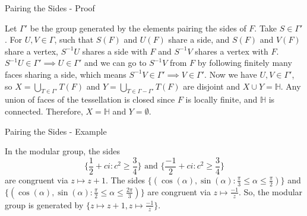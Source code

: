 \documentclass[
	american,
	sections numbered,
	usenames,
	xcolor=dvipsnames,
	aspectratio=169,
]{beamer}
\renewcommand{\H}{\mathbb{H}}
\theoremstyle{plain}%
\begin{document}
\begin{frame}{Pairing the Sides - Proof}

	Let $\Gamma'$ be the group generated by the elements pairing the sides of $F$. Take $S\in\Gamma'$. For $U,V\in\Gamma$, such that $S(F)$ and $U(F)$ share a side, and $S(F)$ and $V(F)$ share a vertex, $S^{-1}U$ shares a side with $F$ and $S^{-1}V$ shares a vertex with $F$. $S^{-1}U\in\Gamma'\implies U\in\Gamma'$ and we can go to $S^{-1}V$ from $F$ by following finitely many faces sharing a side, which means $S^{-1}V\in\Gamma'\implies V\in\Gamma'$. Now we have $U,V\in\Gamma'$, so $X=\bigcup_{T\in\Gamma'}T(F)$ and $Y=\bigcup_{T\in\Gamma-\Gamma'}T(F)$ are disjoint and $X\cup Y=\H$. Any union of faces of the tessellation is closed since $F$ is locally finite, and $\H$ is connected. Therefore, $X=\H$ and $Y=\emptyset$.

\end{frame}

\begin{frame}{Pairing the Sides - Example}

    \begin{minipage}{0.49\textwidth}
		\begin{center}
        \end{center}
	\end{minipage}
	\begin{minipage}{0.5\textwidth}
		In the modular group, the sides $$\{\frac{1}{2}+ci:c^2\geq\frac{3}{4}\}\text{ and }\{\frac{-1}{2}+ci:c^2\geq\frac{3}{4}\}$$ are congruent via $z\mapsto z+1$. The sides $\{(\cos(\alpha),\sin(\alpha):\frac{\pi}{3}\leq\alpha\leq\frac{\pi}{2})\}$ and $\{(\cos(\alpha),\sin(\alpha):\frac{\pi}{2}\leq\alpha\leq\frac{2\pi}{3})\}$ are congruent via $z\mapsto \frac{-1}{z}$. So, the modular group is generated by $\{z\mapsto z+1,z\mapsto \frac{-1}{z}\}$.
	\end{minipage}

\end{frame}
\end{document}
